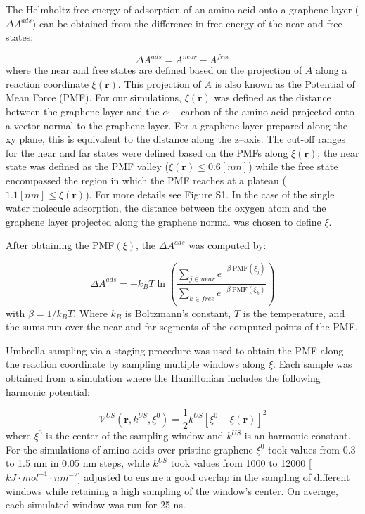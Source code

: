 \documentclass[journal=jcisd8,manuscript=article,layout=twocolumn]{achemso}
\begin{document}
The Helmholtz free energy of adsorption of an amino acid onto a graphene layer ($\Delta A^{ads}$) can be obtained from the difference in free energy of the near and free states:

\begin{equation}
\label{eq:Adsorption}
\Delta A^{ads} = A^{near} - A^{free}
\end{equation}
%
where the near and free states are defined based on the projection of $A$ along a reaction coordinate $\xi(\mathbf{r})$.
This projection of $A$ is also known as the Potential of Mean Force (PMF).
For our simulations, $\xi(\mathbf{r})$ was defined as the distance between the graphene layer and the $\alpha-$carbon of the amino acid projected onto a vector normal to the graphene layer.
For a graphene layer prepared along the xy plane, this is equivalent to the distance along the z--axis.
The cut-off ranges for the near and far states were defined based on the PMFs along $\xi(\mathbf{r})$; the near state was defined as the PMF valley ($\xi(\mathbf{r})\leq 0.6 [nm]$) while the free state encompassed the region in which the PMF reaches at a plateau ($1.1 [nm] \leq\xi(\mathbf{r})$).
For more details see Figure S1.
In the case of the single water molecule adsorption, the distance between the oxygen atom and the graphene layer projected along the graphene normal was chosen to define $\xi$.


After obtaining the PMF$(\xi)$, the $\Delta A^{ads}$ was computed by:

\begin{equation}
\label{eq:Aads-from-PMF}
\Delta A^{ads} = - k_B T \ln \left(\frac{\sum_{j \in near} e^{-\beta~\mathrm{PMF}(\xi_j)}}{\sum_{k \in free} e^{-\beta~\mathrm{PMF}(\xi_k)}}\right)
\end{equation}
%
with $\beta=1/k_BT$. Where $k_B$ is Boltzmann's constant, $T$ is the temperature, and the sums run over the {near} and far segments of the computed points of the PMF.

Umbrella sampling \cite{Torrie_1977} via a staging procedure was used to obtain the PMF along the reaction coordinate by sampling multiple windows along $\xi$.
Each sample was obtained from a simulation where the Hamiltonian includes the following harmonic potential:

\begin{equation}
\label{eq:umbrella-potential}
\mathcal{V}^{US}(\mathbf{r}, k^{US}, \xi^0) = \frac{1}{2}k^{US}[\xi^0
- \xi(\mathbf{r})]^2
\end{equation}
%
where $\xi^0$ is the center of the sampling window and $k^{US}$ is an harmonic constant.
For the simulations of amino acids over pristine graphene $\xi^0$ took values from 0.3 to 1.5 nm in 0.05 nm steps, while $k^{US}$ took values from 1000 to 12000 [$kJ \cdot mol^{-1} \cdot nm^{-2}$] adjusted to ensure a good overlap in the sampling of different windows while retaining a high sampling of the window's center.
On average, each simulated window  was run for 25 ns.
\end{document}
